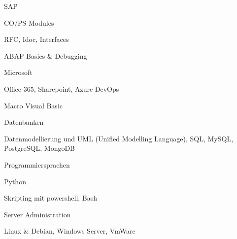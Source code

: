 


\begin{cventries}
	
	\zcventry
	{SAP} %
	{
		\begin{cvitems} %
			\item {CO/PS Modules}
			\item {RFC, Idoc, Interfaces}
			\item {ABAP Basics \& Debugging}
		\end{cvitems}
	}
	
	\zcventry
	{Microsoft} %
	{
		\begin{cvitems} %
			\item {Office 365, Sharepoint, Azure DevOps}
			\item {Macro Visual Basic}
		\end{cvitems}
	}
	
	\zcventry
	{Datenbanken} %
	{
		\begin{cvitems} %
			\item {Datenmodellierung und UML (Unified Modelling Language), SQL, MySQL, PostgreSQL, MongoDB}
		\end{cvitems}
	}
	
	\zcventry
	{Programmiersprachen} %
	{
		\begin{cvitems} %
			\item {Python}
			\item {Skripting mit powershell, Bash}
		\end{cvitems}
	}
	
	\zcventry
	{Server Administration} %
	{
		\begin{cvitems} %
			\item {Linux \& Debian, Windows Server, VmWare}
		\end{cvitems}
	}
	

\end{cventries}
